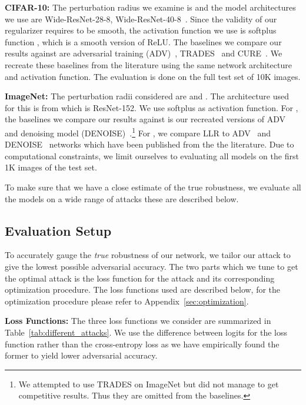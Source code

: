 \documentclass{article}
\theoremstyle{plain}
\theoremstyle{definition}
\theoremstyle{remark}
\begin{document}
\textbf{CIFAR-10: }The perturbation radius we examine is  and the model architectures we use are Wide-ResNet-28-8, Wide-ResNet-40-8~\citep{zagoruyko2016wide}. Since the validity of our regularizer requires  to be smooth, the activation function we use is softplus function , which is a smooth version of ReLU. The baselines we compare our results against are adversarial training (ADV)~\citep{madry2017towards}, TRADES~\cite{zhang2019theoretically} and CURE~\citep{moosavi2018robustness}. We recreate these baselines from the literature using the same network architecture and activation function. The evaluation is done on the full test set of 10K images.

\textbf{ImageNet:} The perturbation radii considered are  and . The architecture used for this is from \citep{he2016deep} which is ResNet-152. We use softplus as activation function. For , the baselines we compare our results against is our recreated versions of ADV~\citep{madry2017towards} and denoising model (DENOISE)~\citep{xie2018feature}.\footnote{We attempted to use TRADES on ImageNet but did not manage to get competitive results. Thus they are omitted from the baselines.} For , we compare LLR to ADV~\citep{madry2017towards} and DENOISE~\citep{xie2018feature} networks which have been published from the the literature. Due to computational constraints, we limit ourselves to evaluating all models on the first 1K images of the test set.

To make sure that we have a close estimate of the true robustness, we evaluate all the models on a wide range of attacks these are described below.

\subsection{Evaluation Setup}\label{sec:attack_defn}
To accurately gauge the {\it true} robustness of our network, we tailor our attack to give the lowest possible adversarial accuracy. The two parts which we tune to get the optimal attack is the loss function for the attack and its corresponding optimization procedure. The loss functions used are described below, for the optimization procedure please refer to Appendix~\ref{sec:optimization}.

\textbf{Loss Functions:} The three loss functions we consider are summarized in Table~\ref{tab:different_attacks}. We use the difference between logits for the loss function rather than the cross-entropy loss as we have empirically found the former to yield lower adversarial accuracy. 
\end{document}

